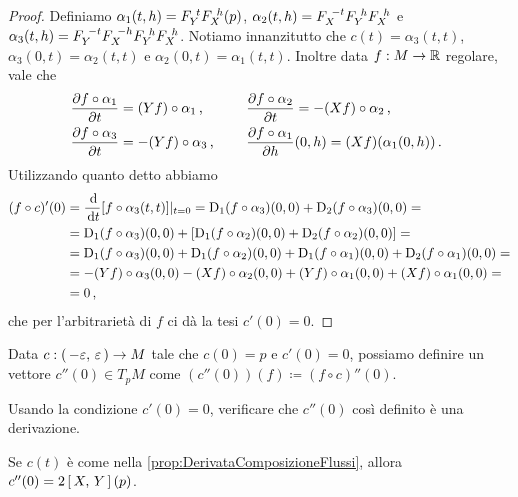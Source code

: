 \begin{proof}
	Definiamo $\alpha_1(t,h)=F_{Y}^{\ t}F_{X}^{\ h}(p)$, $\alpha_2(t,h)=F_{X}^{\ -t}F_{Y}^{\ h}F_{X}^{\ h}$ e $\alpha_3(t,h)=F_{Y}^{\ -t}F_{X}^{\ -h}F_{Y}^{\ h}F_{X}^{\ h}$. Notiamo innanzitutto che $c(t)=\alpha_3(t,t)$, $\alpha_3(0,t)=\alpha_2(t,t)$ e $\alpha_2(0,t)=\alpha_1(t,t)$.
	Inoltre data $f:M\to\mathbb R$ regolare, vale che
	\begin{alignat*}{2}
		&\frac{\partial f\circ\alpha_1}{\partial t}=(Yf)\circ\alpha_1 \, \text{, } \quad&&
		\frac{\partial f\circ \alpha_2}{\partial t} = -(Xf)\circ \alpha_2 \, \text{, }\\
		&\frac{\partial f\circ\alpha_3}{\partial t}=-(Yf)\circ\alpha_3 \, \text{, } \quad&&
		\frac{\partial f\circ\alpha_1}{\partial h}(0,h)=(Xf)(\alpha_1(0,h)) \, \text{. }
	\end{alignat*}
	Utilizzando quanto detto abbiamo
	\begin{align*}
	(f\circ c)'(0)&=\frac{\,\mathrm d}{\,\mathrm d t}[f\circ\alpha_3(t,t)]|_{t=0} =\mathrm D_1(f\circ \alpha_3)(0,0)+\mathrm D_2(f\circ\alpha_3)(0,0) =
	\\ &=\mathrm D_1(f\circ\alpha_3)(0,0)+\left[\mathrm D_1(f\circ\alpha_2)(0,0)+\mathrm D_2(f\circ\alpha_2)(0,0) \right] =
	\\ &=\mathrm D_1(f\circ\alpha_3)(0,0)+\mathrm D_1(f\circ\alpha_2)(0,0)+\mathrm D_1(f\circ\alpha_1)(0,0)+\mathrm D_2(f\circ\alpha_1)(0,0) =
	\\ &=-(Yf)\circ\alpha_3(0,0)-(Xf)\circ\alpha_2(0,0)+(Yf)\circ\alpha_1(0,0)+(Xf)\circ\alpha_1(0,0) =
	\\ &=0 \, \text{, }
	\end{align*}
	che per l'arbitrarietà di $f$ ci dà la tesi $c'(0)=0$.
\end{proof}

\begin{proposition} \label{prop:DefinizioneDerSeconda}
	Data $c:\left(\,-\varepsilon,\,\varepsilon\,\right)\to M$ tale che $c(0)=p$ e $c'(0)=0$, possiamo definire un vettore $c''(0)\in T_pM$ come $(c''(0))(f)\coloneqq(f\circ c)''(0)$.
\end{proposition}

\begin{exercise}
	Usando la condizione $c'(0)=0$, verificare che $c''(0)$  così definito è una derivazione.
\end{exercise}

\begin{theorem}
	Se $c(t)$ è come nella \cref{prop:DerivataComposizioneFlussi}, allora $c''(0)=2\left[\,X,\,Y\,\right](p)$.
\end{theorem}

